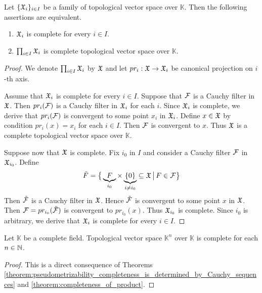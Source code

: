 \begin{theorem}\label{theorem:completeness_of_product}
   Let $\{{\mathfrak X}_i\}_{i \in I}$ be a family of topological vector space over $\mathbb{K}$. Then the following assertions are equivalent.
   \begin{enumerate}[label=\emph{\textbf{(\roman*)}}, leftmargin=*]
      \item ${\mathfrak X}_i$ is complete for every $i \in I$.
      \item $\prod_{i \in I}{\mathfrak X}_i$ is complete topological vector space over $\mathbb{K}$.
   \end{enumerate}
\end{theorem}
\begin{proof}
   We denote $\prod_{i\in I}{\mathfrak X}_i$ by ${\mathfrak X}$ and let $pr_i:{\mathfrak X} \rightarrow {\mathfrak X}_i$ be canonical projection on $i$-th axis.

   Assume that ${\mathfrak X}_i$ is complete for every $i \in I$. Suppose that ${\mathcal F}$ is a Cauchy filter in ${\mathfrak X}$. Then $pr_i({\mathcal F})$ is a Cauchy filter in ${\mathfrak X}_i$ for each $i$. Since ${\mathfrak X}_i$ is complete, we derive that $pr_i({\mathcal F})$ is convergent to some point $x_i$ in ${\mathfrak X}_i$. Define $x \in {\mathfrak X}$ by condition $pr_i(x) = x_i$ for each $i \in I$. Then ${\mathcal F}$ is convergent to $x$. Thus ${\mathfrak X}$ is a complete topological vector space over $\mathbb{K}$.

   Suppose now that ${\mathfrak X}$ is complete. Fix $i_0$ in $I$ and consider a Cauchy filter ${\mathcal F}$ in ${\mathfrak X}_{i_0}$. Define
   $$\tilde{F} = \big\{\underbrace{F}_{i_0} \times \underbrace{\{0\}}_{i\neq i_0} \subseteq {\mathfrak X}\,\big|\,F\in {\mathcal F}\big\}$$
   Then $\tilde{{\mathcal F}}$ is a Cauchy filter in ${\mathfrak X}$. Hence $\tilde{{\mathcal F}}$ is convergent to some point $x$ in ${\mathfrak X}$. Then ${\mathcal F} = pr_{i_0}(\tilde{{\mathcal F}})$ is convergent to $pr_{i_0}(x)$. Thus ${\mathfrak X}_{i_0}$ is complete. Since $i_0$ is arbitrary, we derive that ${\mathfrak X}_i$ is complete for every $i\in I$.
\end{proof}

\begin{corollary}\label{corollary:finite_products_of_copies_of_field_are_complete}
   Let $\mathbb{K}$ be a complete field. Topological vector space $\mathbb{K}^n$ over $\mathbb{K}$ is complete for each $n\in {\mathbb N}$.
\end{corollary}
\begin{proof}
   This is a direct consequence of Theorems \ref{theorem:pseudometrizability_completeness_is_determined_by_Cauchy_sequences} and \ref{theorem:completeness_of_product}.
\end{proof}

